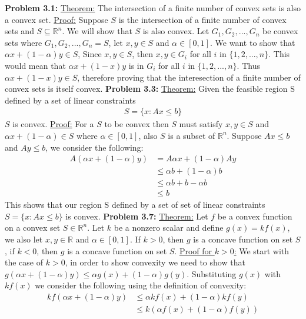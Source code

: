 \documentclass{article}
\begin{document}
\break \break
\textbf{Problem 3.1:} \underline{Theorem:} The intersection of a finite number of convex sets is also a convex set.
\newline \underline{Proof:} Suppose $S$ is the intersection of a finite number of convex sets and $S \subseteq \mathbb{R}^n$. We will show that $S$ is also convex. Let $G_1, G_2, ... , G_n$ be convex sets where $G_1, G_2, ... , G_n = S$, let $x, y \in S$ and $\alpha \in [0,1]$. We want to show that $\alpha x + (1-\alpha)y \in S$, Since $x,y \in S$, then $x,y \in G_i$ for all $i$ in $ \{1, 2, ..., n\} $. This would mean that $\alpha x + (1 - x)y$ is in $G_i$ for all $i$ in $\{1,2,...,n\}$. Thus $\alpha x + (1 - x)y \in S$, therefore proving that the interesection of a finite number of convex sets is itself convex.
\break
\break
\textbf{Problem 3.3:} \underline{Theorem:} Given the feasible region S defined by a set of linear constraints
\begin{align*}
    S = \{ x : Ax \leq b \}
\end{align*}
$S$ is convex.
\newline \underline{Proof:} For a $S$ to be convex then $S$ must satisfy $x,y \in S$ and $\alpha x + (1 - \alpha) \in S$ where $\alpha \in [0,1]$, also $S$ is a subset of $\mathbb{R}^n$.  Suppose $Ax \leq b$ and $Ay \leq b$, we consider the following:
\begin{align*}
    A(\alpha x + (1 - \alpha)y) & = A\alpha x + (1 - \alpha)Ay \\
    & \leq \alpha b + (1 - \alpha)b \\
    & \leq \alpha b + b - \alpha b \\
    & \leq b 
\end{align*}
This shows that our region S defined by a set of set of linear constraints $S = \{ x : Ax \leq b \}$ is convex.
\break
\break
\textbf{Problem 3.7:} \underline{Theorem:} Let $f$ be a convex function on a convex set $S \in \mathbb{R}^n$. Let $k$ be a nonzero scalar and define $g(x) = kf(x)$, we also let $x,y \in \mathbb{R}$ and $\alpha \in [0,1]$. If  $k > 0$, then $g$ is a concave function on set $S$, if $k < 0$, then $g$ is a concave function on set $S$.
\newline \underline{Proof for $k > 0$:} We start with the case of $k > 0$, in order to show convexity we need to show that $g(\alpha x + (1 - \alpha)y)  \leq \alpha g(x) + (1 - \alpha)g(y)$. Substituting $g(x)$ with $kf(x)$ we consider the following using the definition of convexity:
\begin{align*}
    kf(\alpha x + (1 - \alpha)y) & \leq \alpha kf(x) + (1 - \alpha)kf(y) \\ 
    & \leq k(\alpha f(x) + (1 - \alpha)f(y)) 
\end{align*}
\end{document}
